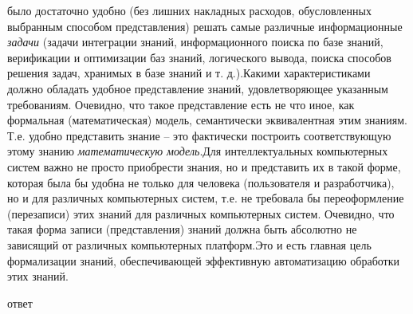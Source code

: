 \begin{SCn}
\begin{scnsubstruct}
{			было достаточно удобно (без лишних накладных расходов, обусловленных выбранным
			способом представления) решать самые различные информационные \textit{задачи}
			(задачи интеграции знаний, информационного поиска по базе знаний, верификации и
			оптимизации баз знаний, логического вывода, поиска способов решения задач,
			хранимых в базе знаний и т. д.).Какими характеристиками должно обладать удобное
			представление знаний, удовлетворяющее указанным требованиям. Очевидно, что
			такое представление есть не что иное, как формальная (математическая) модель,
			семантически эквивалентная этим знаниям. Т.е. удобно представить знание -- это
			фактически построить соответствующую этому знанию \textit{математическую
				модель}.Для интеллектуальных компьютерных систем важно не просто приобрести
			знания, но и представить их в такой форме, которая была бы удобна не только для
			человека (пользователя и разработчика), но и для различных компьютерных систем,
			т.е. не требовала бы переоформление (перезаписи) этих знаний для различных
			компьютерных систем. Очевидно, что такая форма записи (представления) знаний
			должна быть абсолютно не зависящий от различных компьютерных платформ.Это и
			есть главная цель формализации знаний, обеспечивающей эффективную автоматизацию
			обработки этих знаний.}
		~\\
		\begin{scnrelfromset}{ответ}
		\end{scnrelfromset}


\end{scnsubstruct}
\end{SCn}
